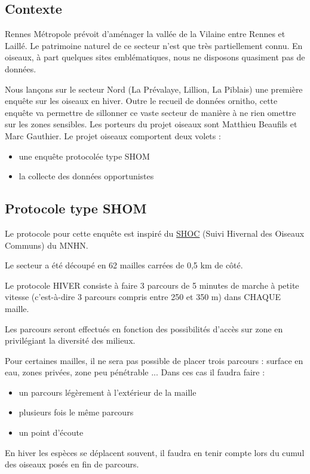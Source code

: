 \twocolumn
\renewcommand{\monlhead}{Enquête oiseaux en hiver}
\subsection*{Contexte}
Rennes Métropole prévoit d'aménager la vallée de la Vilaine entre Rennes et Laillé. Le patrimoine naturel de ce secteur n'est que très partiellement connu. En oiseaux, à part quelques sites emblématiques, nous ne disposons quasiment pas de données.


Nous lançons sur le secteur Nord (La Prévalaye, Lillion, La Piblais)  une première enquête sur les oiseaux en hiver.
Outre le recueil de données ornitho, cette enquête va permettre de sillonner ce vaste secteur de manière à ne rien omettre sur les zones sensibles. Les porteurs du projet oiseaux sont Matthieu Beaufils et Marc Gauthier.
Le projet oiseaux comportent deux volets :
\begin{itemize}
\item une enquête protocolée type SHOM
\item la collecte des données opportunistes
\end{itemize}
\subsection*{Protocole type SHOM}
Le protocole pour cette enquête est inspiré du \href{http://vigienature.mnhn.fr/sites/vigienature.mnhn.fr/files/uploads/Protocole_SHOC_2014_0.pdf}{SHOC} (Suivi Hivernal des Oiseaux Communs) du MNHN.

Le secteur a été découpé en 62 mailles carrées de 0,5 km de côté.

Le protocole HIVER consiste à faire 3 parcours de 5 minutes de marche à petite vitesse (c’est-à-dire 3 parcours compris entre 250 et 350 m) dans CHAQUE maille.

Les parcours seront effectués en fonction des possibilités d’accès sur zone en privilégiant la diversité des milieux.

Pour certaines mailles, il ne sera pas possible de placer trois parcours : surface en eau, zones privées, zone peu pénétrable ...
Dans ces cas il faudra faire :
\begin{itemize}
\item un parcours légèrement à l'extérieur de la maille
\item plusieurs fois le même parcours
\item un point d'écoute
\end{itemize}
En hiver les espèces se déplacent souvent, il faudra en tenir compte lors du cumul des oiseaux posés en fin de parcours.


